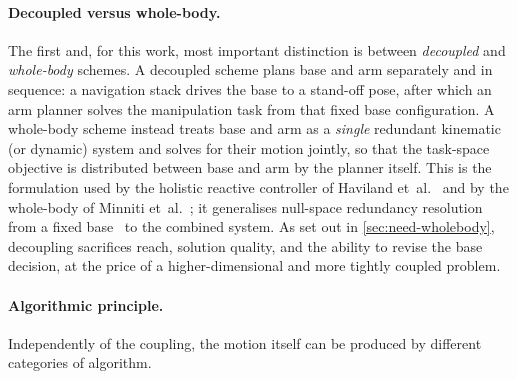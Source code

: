 \paragraph{Decoupled versus whole-body.}
The first and, for this work, most important distinction is between
\emph{decoupled} and \emph{whole-body} schemes. A decoupled scheme plans
base and arm separately and in sequence: a navigation stack drives the
base to a stand-off pose, after which an arm planner solves the
manipulation task from that fixed base configuration. A whole-body
scheme instead treats base and arm as a \emph{single} redundant
kinematic (or dynamic) system and solves for their motion jointly, so
that the task-space objective is distributed between base and arm by the
planner itself. This is the formulation used by the holistic reactive
controller of Haviland et~al.~\cite{Haviland2022Holistic} and by the
whole-body \mpc{} of Minniti
et~al.~\cite{Minniti2019WholeBodyMPC}; it generalises null-space
redundancy resolution from a fixed base~\cite{Dietrich2015NullSpace} to
the combined system. As set out in \cref{sec:need-wholebody}, decoupling
sacrifices reach, solution quality, and the ability to revise the base
decision, at the price of a higher-dimensional and more tightly coupled
problem.

\paragraph{Algorithmic principle.}
Independently of the coupling, the motion itself can be produced by
different categories of algorithm.

